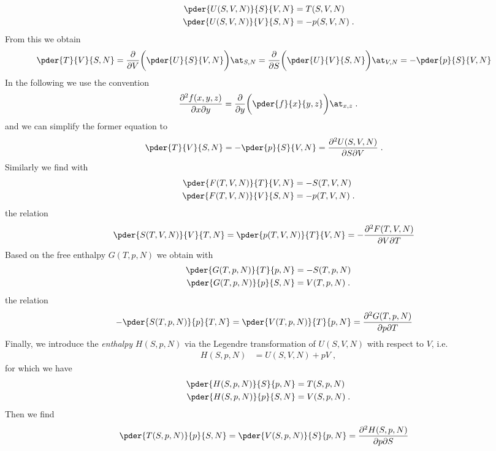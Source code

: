 \begin{align*}
\pder{U(S,V,N)}{S}{V,N} &= T(S,V,N)\\
\pder{U(S,V,N)}{V}{S,N} &= -p(S,V,N)\;.
\end{align*}
%
From this we obtain
%
\begin{align*}
\pder{T}{V}{S,N} &=\frac{\partial }{\partial V}\bigg(\pder{U}{S}{V,N}\bigg)\at_{S,N}
 =\frac{\partial }{\partial S}\bigg(\pder{U}{V}{S,N}\bigg)\at_{V,N}
 =-\pder{p}{S}{V,N}
\end{align*}
%
In the following we use the convention
%
\begin{align*}
\frac{\partial^{2}f(x,y,z)}{\partial x\partial y } 
=\frac{\partial }{\partial y}\bigg(\pder{f}{x}{y,z}\bigg)\at_{x,z}\;.
\end{align*}
%
and we can simplify the former equation to
%
\begin{align*}
\pder{T}{V}{S,N} &= -\pder{p}{S}{V,N}
 =\frac{\partial^{2}U(S,V,N) }{\partial S\partial V}\;.
\end{align*}
%
Similarly we find with
\begin{align*}
\pder{F(T,V,N)}{T}{V,N} &= -S(T,V ,N)\\
\pder{F(T,V,N)}{V}{S,N} &= -p(T,V ,N)\;.
\end{align*}
%
the relation
%
\begin{align*}
\pder{S(T,V,N)}{V}{T,N} & =\pder{p(T,V,N)}{T}{V,N}
=-\frac{\partial^{2} F(T,V,N)}{\partial V\partial T}
\end{align*}
%
Based on the free enthalpy $G(T,p,N)$
we obtain with
%
\begin{align*}
\pder{G(T,p,N)}{T}{p,N} &= -S(T,p ,N)\\
\pder{G(T,p,N)}{p}{S,N} &= V(T,p ,N)\;.
\end{align*}
%
the relation
%
\begin{align*}
-\pder{S(T,p,N)}{p}{T,N} & =\pder{V(T,p,N)}{T}{p,N}
=\frac{\partial^{2} G(T,p,N)}{\partial p\partial T}
\end{align*}
%
Finally, we introduce the {\em enthalpy} $H(S,p,N)$ via the Legendre transformation of
$U(S,V,N)$ with respect to $V$, i.e.
%
\begin{align*}
H(S,p,N) &= U(S,V,N) + pV\;,
\end{align*}
% 
for which we have
%
\begin{align*}
\pder{H(S,p,N)}{S}{p,N} &= T(S,p ,N)\\
\pder{H(S,p,N)}{p}{S,N} &= V(S,p ,N)\;.
\end{align*}
%
Then we find
\begin{align*}
\pder{T(S,p,N)}{p}{S,N} & =\pder{V(S,p,N)}{S}{p,N}
=\frac{\partial^{2} H(S,p,N)}{\partial p\partial S}
\end{align*}

